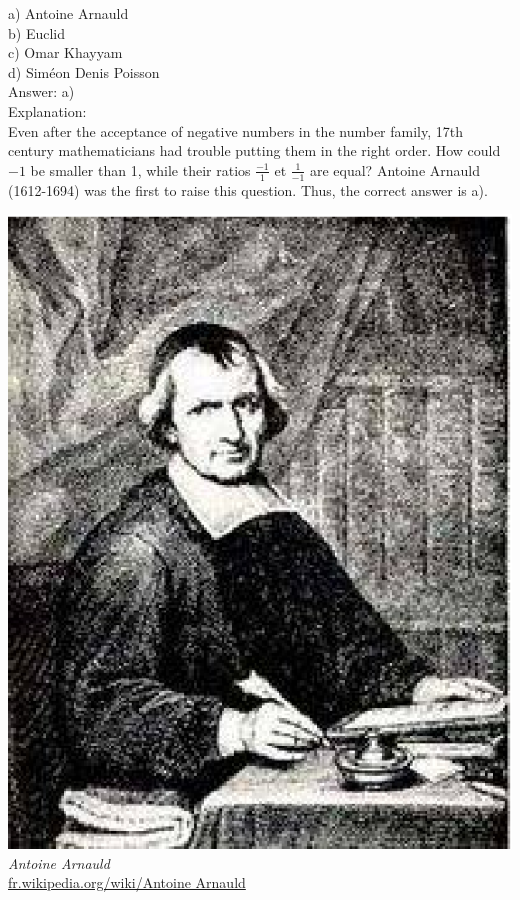 \documentclass[letterpaper, 12pt]{article}
\begin{document}
a) Antoine Arnauld\\
b) Euclid\\
c) Omar Khayyam\\
d) Sim\'eon Denis Poisson\\

Answer: a)\\

Explanation:\\
Even after the acceptance of negative numbers in the number family, 17th century mathematicians had trouble putting them in the right order. How could $-1$ be smaller than 1, while their ratios $\frac{-1}{1}$ et $\frac{1}{-1}$ are equal? Antoine Arnauld {\small (1612-1694)} was the first to raise this question. Thus, the correct answer is a).

\begin{center}
\includegraphics[scale=0.5]{Antoine_Arnauld.eps}\\
\emph{{\small Antoine Arnauld}}\\
\href{http://fr.wikipedia.org/wiki/Antoine Arnauld}{fr.wikipedia.org/wiki/Antoine Arnauld}\\[5mm]
\end{center}
\end{document}
